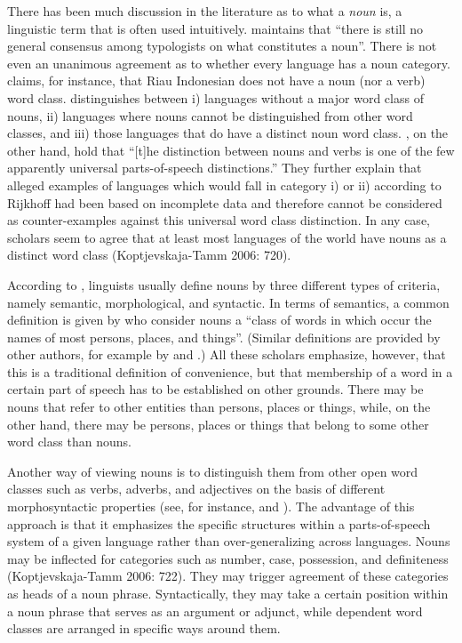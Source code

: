 There has been much discussion in the literature as to what a {\itshape noun} is, a linguistic term that is often used intuitively. \citet[10]{rijkhoff2002} maintains that ``there is still no general consensus among typologists on what constitutes a noun''. There is not even an unanimous agreement as to whether every language has a noun category. \citet{gil2013} claims, for instance, that Riau Indonesian does not have a noun (nor a verb) word class. \citet[12]{rijkhoff2002} distinguishes between i) languages without a major word class of nouns, ii) languages where nouns cannot be distinguished from other word classes, and iii) those languages that do have a distinct noun word class. \citet[5]{schachter2007}, on the other hand, hold that ``[t]he distinction between nouns and verbs is one of the few apparently universal parts-of-speech distinctions.'' They further explain that alleged examples of languages which would fall in category i) or ii) according to Rijkhoff had been based on incomplete data and therefore cannot be considered as counter-examples against this universal word class distinction. In any case, scholars seem to agree that at least most languages of the world have nouns as a distinct word class (Koptjevskaja-Tamm 2006: 720). 

According to \citet[708]{evans2000}, linguists usually define nouns by three different types of criteria, namely semantic, morphological, and syntactic.
In terms of semantics, a common definition is given by \citet[5]{schachter2007} who consider nouns a ``class of words in which occur the names of most persons, places, and things''. (Similar definitions are provided by other authors, for example by \citet[720]{tamm2006} and \citet[710]{evans2000}.) All these scholars emphasize, however, that this is a traditional definition of convenience, but that membership of a word in a certain part of speech has to be established on other grounds. There may be nouns that refer to other entities than persons, places or things, while, on the other hand, there may be persons, places or things that belong to some other word class than nouns. 

Another way of viewing nouns is to distinguish them from other open word classes such as verbs, adverbs, and adjectives on the basis of different morphosyntactic properties  (see, for instance, \citet{bhat2000} and \citet{baker2003}). The advantage of this approach is that it emphasizes the specific structures within a parts-of-speech system of a given language rather than over-generalizing across languages. Nouns may be inflected for categories such as number, case, possession, and definiteness (Koptjevskaja-Tamm 2006: 722). They may trigger agreement of these categories as heads of a noun phrase. Syntactically, they may take a certain position within a noun phrase that serves as an argument or adjunct, while dependent word classes are arranged in specific ways around them.

